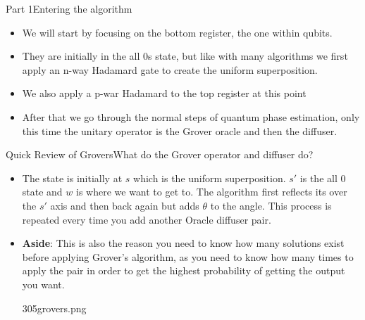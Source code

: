 \begin{frame}{Part 1}{Entering the algorithm}
\begin{itemize}
    \item We will start by focusing on the bottom register, the one within qubits.
    \item They are initially in the all 0s state, but like with many algorithms we first apply an n-way Hadamard gate to create the uniform superposition.
        \item We also apply a p-war Hadamard to the top register at this point

    \item After that we go through the normal steps of quantum phase estimation, only this time the unitary operator is the Grover oracle and then the diffuser.


\end{itemize}
\end{frame}

\begin{frame}{Quick Review of Grovers}{What do the Grover operator and diffuser do?}
\begin{itemize}
    \item The state is initially at $s$ which is the uniform superposition. $s'$ is the all 0 state and $w$ is where we want to get to. The algorithm first reflects its over the $s'$ axis and then back again but adds $\theta$ to the angle. This process is repeated every time you add another Oracle diffuser pair. 
    \item \textbf{Aside}: This is also the reason you need to know how many solutions exist before applying Grover's algorithm, as you need to know how many times to apply the pair in order to get the highest probability of getting the output you want.

     \begin{center}\begin{Pixture}[width=0.15\textwidth]{305}{grovers.png}
\end{Pixture}\end{center}

\end{itemize}
\end{frame}



